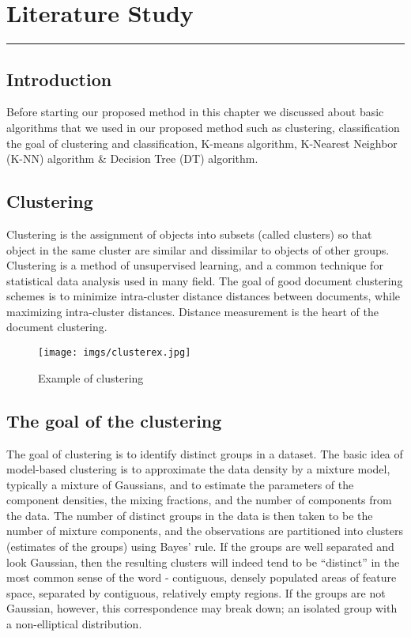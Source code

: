 \documentclass[document.tex]{subfiles}
\begin{document}
\chapter{Literature Study}
\hrule
\newpage
\section{Introduction}
Before starting our proposed method in this chapter we discussed about basic algorithms that we used in our proposed method such as clustering, classification the goal of clustering and classification, K-means algorithm, K-Nearest Neighbor (K-NN) algorithm \& Decision Tree (DT) algorithm. 

\section{Clustering}
Clustering is the assignment of objects into subsets (called clusters) so that object in the same cluster are similar and dissimilar to objects of other groups. Clustering is a method of unsupervised learning, and a common technique for statistical data analysis used in many field. The goal of good document clustering schemes is to minimize intra-cluster distance distances between documents, while maximizing intra-cluster distances. Distance measurement is the heart of the document clustering. 
\begin{figure}[H]
	\centering
	\texttt{[image: imgs/clusterex.jpg]}
	\caption[Example of clustering\cite{a35}]
	{Example of clustering\cite{a35}}
\end{figure}

\section{The goal of the clustering}
The goal of clustering is to identify distinct groups in a dataset. The basic idea of model-based clustering is to approximate the data density by a mixture model, typically a mixture of Gaussians, and to estimate the parameters of the component densities, the mixing fractions, and the number of components from the data. The number of distinct groups in the data is then taken to be the number of mixture components, and the observations are partitioned into clusters (estimates of the groups) using Bayes' rule. If the groups are well separated and look Gaussian, then the resulting clusters will indeed tend to be ``distinct'' in the most common sense of the word - contiguous, densely populated areas of feature space, separated by contiguous, relatively empty regions. If the groups are not Gaussian, however, this correspondence may break down; an isolated group with a non-elliptical distribution.
\end{document}
